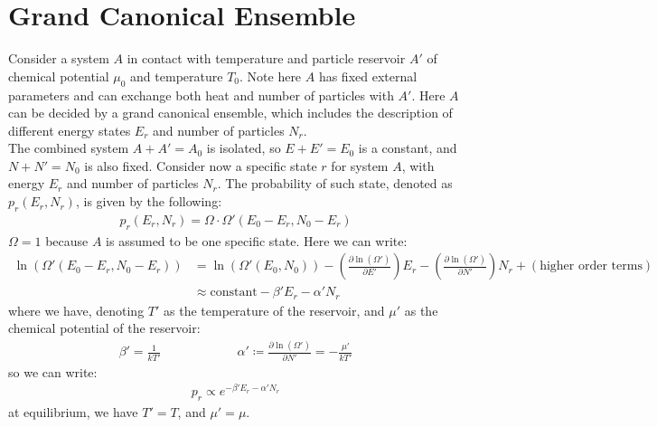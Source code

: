 \documentclass[11pt,oneside]{book}
\theoremstyle{break}
\theoremstyle{break}
\newcommand{\pd}{\partial}
\newcommand{\lr}[1]{\left( #1 \right)}
\begin{document}
\section[Grand Canonical Ensemble]{\color{red} Grand Canonical Ensemble\color{black}}
Consider a system $A$ in contact with temperature and particle reservoir $A'$ of chemical potential $\mu_0$ and temperature $T_0$. Note here $A$ has fixed external parameters and can exchange both heat and number of particles with $A'$. Here $A$ can be decided by a grand canonical ensemble, which includes the description of different energy states $E_r$ and number of particles $N_r$.\\

The combined system $A + A' = A_0$ is isolated, so $E+E' = E_0$ is a constant, and $N + N' = N_0$ is also fixed. Consider now a specific state $r$ for system $A$, with energy $E_r$ and number of particles $N_r$. The probability of such state, denoted as $p_r(E_r,N_r)$, is given by the following:
\begin{align*}
p_r(E_r, N_r) = \Omega \cdot \Omega'(E_0 - E_r, N_0 - E_r)
\end{align*}
$\Omega = 1$ because $A$ is assumed to be one specific state. Here we can write:
\begin{align*}
\ln(\Omega'(E_0 - E_r, N_0 - E_r)) &= \ln(\Omega' (E_0, N_0)) - \lr{\frac{\pd \ln(\Omega')}{\pd E'}}E_r - \lr{\frac{\pd \ln(\Omega')}{\pd N'}}N_r + (\text{higher order terms})\\
&\approx \text{constant}  -\beta' E_r -\alpha' N_r
\end{align*}
where we have, denoting $T'$ as the temperature of the reservoir, and $\mu'$ as the chemical potential of the reservoir:
\begin{align*}
\beta ' = \frac{1}{kT'} \qquad\qquad \qquad \alpha' \coloneqq \frac{\pd \ln(\Omega')}{\pd N'} = -\frac{\mu'}{kT'}
\end{align*}
so we can write:
\begin{align*}
p_r \propto e^{-\beta ' E_r - \alpha' N_r}
\end{align*} 
at equilibrium, we have $T'= T$, and $\mu' = \mu$. \\
\end{document}
